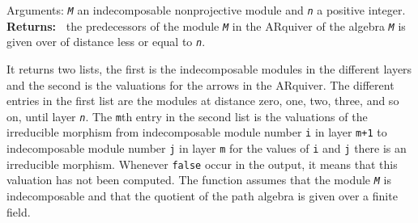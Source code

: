 \documentclass[a4paper,11pt]{report}
\begin{document}
{{{ Arguments: \mbox{\texttt{\mdseries\slshape M}} \texttt{} an indecomposable non\texttt{}projective
module and \mbox{\texttt{\mdseries\slshape n}} \texttt{} a positive integer.\\
 \textbf{\indent Returns:\ }
the predecessors of the module \mbox{\texttt{\mdseries\slshape M}} in the AR\texttt{}quiver of the algebra \mbox{\texttt{\mdseries\slshape M}} is given over of distance less or equal to \mbox{\texttt{\mdseries\slshape n}}. 



 It returns two lists, the first is the indecomposable modules in the different
layers and the second is the valuations for the arrows in the
AR\texttt{}quiver. The different entries in the first list are the
modules at distance zero, one, two, three, and so on, until layer \mbox{\texttt{\mdseries\slshape n}}. The \texttt{m}\texttt{}th entry in the second list is the valuations of the
irreducible morphism from indecomposable module number \texttt{i} in layer \texttt{m+1} to indecomposable module number \texttt{j} in layer \texttt{m} for the values of \texttt{i} and \texttt{j} there is an irreducible morphism. Whenever \texttt{false} occur in the output, it means that this valuation has not been computed. The
function assumes that the module \mbox{\texttt{\mdseries\slshape M}} is indecomposable and that the quotient of the path algebra is given over a
finite field. }

}}
\end{document}
